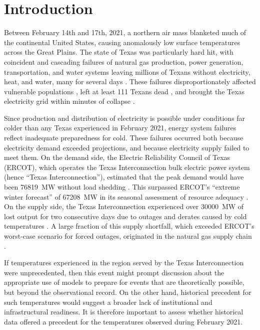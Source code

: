 \documentclass[12pt]{iopart}
\begin{document}
\section{Introduction}

Between February 14th and 17th, 2021, a  northern air mass blanketed much of the continental United States, causing anomalously low surface temperatures across the Great Plains.
The state of Texas was particularly hard hit, with coincident and cascading failures of natural gas production, power generation, transportation, and water systems leaving millions of Texans without electricity, heat, and water, many for several days \cite{ceser_winterupdate:2021,clack_uri:2021,smead_eyesoftx:2021}.
These failures disproportionately affected vulnerable populations \cite{dobbins_blackoutdisparity:2021}, left at least 111 Texans dead \cite{mulcahy_urideath:2021}, and brought the Texas electricity grid within minutes of collapse \cite{magness_review:2021}.

Since production and distribution of electricity is possible under conditions far colder than any Texas experienced in February 2021, energy system failures reflect inadequate preparedness for cold.
These failures occurred both because electricity demand exceeded projections, and because electricity supply failed to meet them.
On the demand side, the Electric Reliability Council of Texas (ERCOT), which operates the Texas Interconnection bulk electric power system (hence ``Texas Interconnection''), estimated that the peak demand would have been \SI{76819}{\mega\watt} without load shedding \cite{magness_review:2021}.
This surpassed ERCOT's ``extreme winter forecast'' of \SI{67208}{\mega\watt} in its seasonal assessment of resource adequacy \cite{ercotpublic_sarawinter:2020}.
On the supply side, the Texas Interconnection experienced over \SI{30000}{\mega\watt} of lost output for two consecutive days due to outages and derates caused by cold temperatures \cite{ercotpublic_outagesv2:2021}.
A large fraction of this supply shortfall, which exceeded ERCOT's worst-case scenario for forced outages, originated in the natural gas supply chain \cite{ercotpublic_outagesv2:2021,smead_eyesoftx:2021,ceser_winterupdate:2021}.

If temperatures experienced in the region served by the Texas Interconnection were unprecedented, then this event might prompt discussion about the appropriate use of models to prepare for events that are theoretically possible, but beyond the observational record.
On the other hand, historical precedent for such temperatures would suggest a broader lack of institutional and infrastructural readiness.
It is therefore important to assess whether historical data offered a precedent for the temperatures observed during February 2021.
\end{document}
